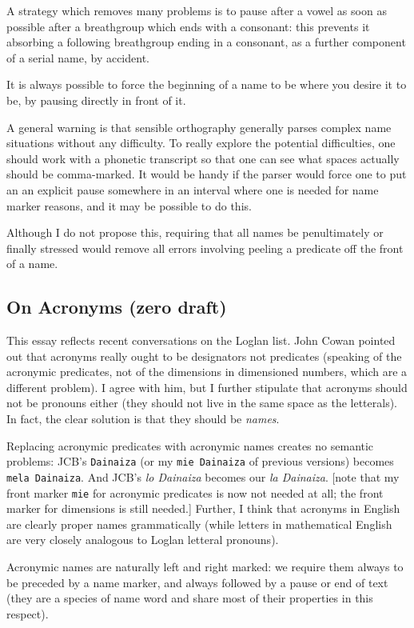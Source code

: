 \documentclass[12pt]{article}
\begin{document}
A strategy which removes many problems is to pause after a vowel as soon as possible after a breathgroup which ends with a consonant:  this prevents it absorbing a following breathgroup ending in a consonant, as a further component of a serial name, by accident.

It is always possible to force the beginning of a name to be where you desire it to be, by pausing directly in front of it.

A general warning is that sensible orthography generally parses complex name situations without any difficulty.   To really explore the potential difficulties, one should work with a phonetic transcript so that one can see what spaces actually should be comma-marked.  It would be handy if the parser would force one to put an an explicit pause somewhere in an interval where one is needed for name marker reasons, and it may be possible to do this.

Although I do not propose this, requiring that all names be penultimately or finally stressed would remove all errors involving peeling a predicate off the front of a name.

\subsection{On Acronyms (zero draft)}

This essay reflects recent conversations on the Loglan list.   John Cowan pointed out that acronyms really ought to be designators not predicates (speaking of the acronymic predicates, not of the dimensions in dimensioned numbers, which are a different problem).   I agree with him, but I further stipulate that acronyms should not be pronouns either (they should not live in the same space as the letterals).   In fact, the clear solution is that they should be {\em names\/}.

Replacing acronymic predicates with acronymic names creates no semantic problems:  JCB's {\tt Dainaiza} (or my {\tt mie Dainaiza} of previous versions) becomes
{\tt mela Dainaiza}.  And JCB's {\em lo Dainaiza} becomes our {\em la Dainaiza}.  [note that my front marker {\tt mie} for acronymic predicates is now not needed at all;
the front marker for dimensions is still needed.]   Further, I think that acronyms in English are clearly proper names grammatically (while letters in mathematical English are very closely analogous to Loglan letteral pronouns).

Acronymic names are naturally left and right marked:  we require them always to be preceded by a name marker, and always followed by a pause or end of text (they are a species of name word and share most of their properties in this respect).
\end{document}
